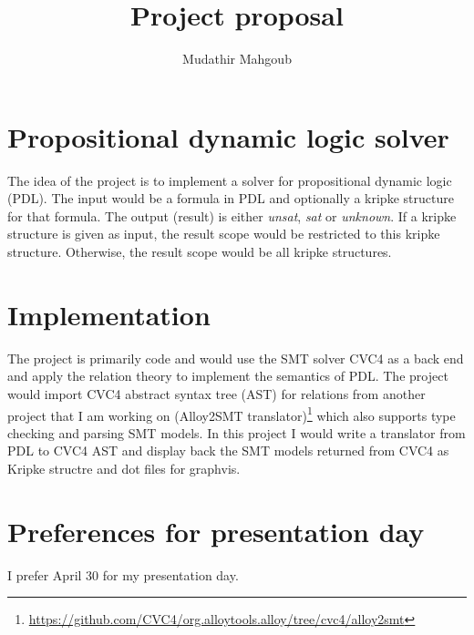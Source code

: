\documentclass[12pt,a4paper]{article}
\author{Mudathir Mahgoub}
\title{Project proposal}
\begin{document}
\maketitle

\section{Propositional dynamic logic solver}
The idea of the project is to implement a solver for propositional dynamic logic (PDL). The input would be a formula in PDL and optionally a kripke structure for that formula. The output (result) is either \textit{unsat}, \textit{sat} or \textit{unknown}. If a kripke structure is given as input, the result scope would be restricted to this kripke structure. Otherwise, the result scope would be all kripke structures. 

\section{Implementation}
The project is primarily code and would use the SMT solver CVC4 as a back end and apply the relation theory to implement the semantics of PDL. The project would import CVC4 abstract syntax tree (AST) for relations from another project that I am working on (Alloy2SMT translator)\footnote{\url{https://github.com/CVC4/org.alloytools.alloy/tree/cvc4/alloy2smt}} which also supports type checking and parsing SMT models. In this project I would write a translator from PDL to CVC4 AST and display back the SMT models returned from CVC4 as Kripke structre and dot files for graphvis.


\section{Preferences for presentation day}
I prefer April 30 for my presentation day.
\end{document}
